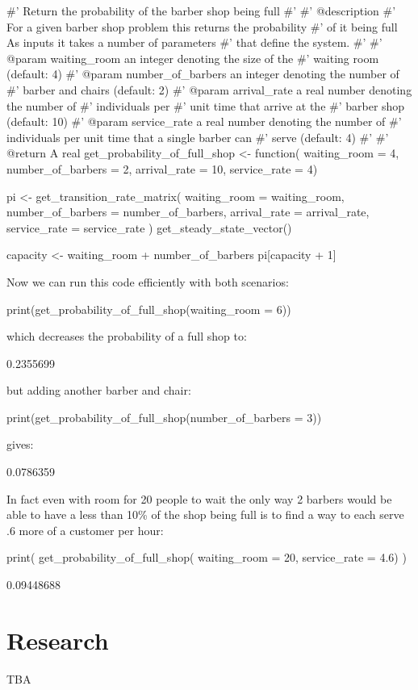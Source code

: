 \begin{Rin}
#' Return the probability of the barber shop being full
#'
#' @description
#' For a given barber shop problem this returns the probability
#' of it being full As inputs it takes a number of parameters
#' that define the system.
#'
#' @param waiting_room an integer denoting the size of the
#'        waiting room (default: 4)
#' @param number_of_barbers an integer denoting the number of
#'        barber and chairs (default: 2)
#' @param arrival_rate a real number denoting the number of
#'        individuals per #' unit time that arrive at the
#'        barber shop (default: 10)
#' @param service_rate a real number denoting the number of
#'        individuals per unit time that a single barber can
#'        serve (default: 4)
#'
#' @return A real
get_probability_of_full_shop <- function(
                                         waiting_room = 4,
                                         number_of_barbers = 2,
                                         arrival_rate = 10,
                                         service_rate = 4) {
  pi <- get_transition_rate_matrix(
    waiting_room = waiting_room,
    number_of_barbers = number_of_barbers,
    arrival_rate = arrival_rate,
    service_rate = service_rate
  ) %
    get_steady_state_vector()

  capacity <- waiting_room + number_of_barbers
  pi[capacity + 1]
}
\end{Rin}

Now we can run this code efficiently with both scenarios:

\begin{Rin}
print(get_probability_of_full_shop(waiting_room = 6))
\end{Rin}

which decreases the probability of a full shop to:

\begin{Rout}
[1] 0.2355699
\end{Rout}

but adding another barber and chair:

\begin{Rin}
print(get_probability_of_full_shop(number_of_barbers = 3))
\end{Rin}

gives:

\begin{Rout}
[1] 0.0786359
\end{Rout}

In fact even with room for 20 people to wait the only way 2 barbers would be
able to have a less than 10\% of the shop being full is to find a way to each
serve .6 more of a customer per hour:

\begin{Rin}
print(
    get_probability_of_full_shop(
        waiting_room = 20,
        service_rate = 4.6)
        )
\end{Rin}

\begin{Rout}
[1] 0.09448688
\end{Rout}

\section{Research}\label{sec:research}

TBA
